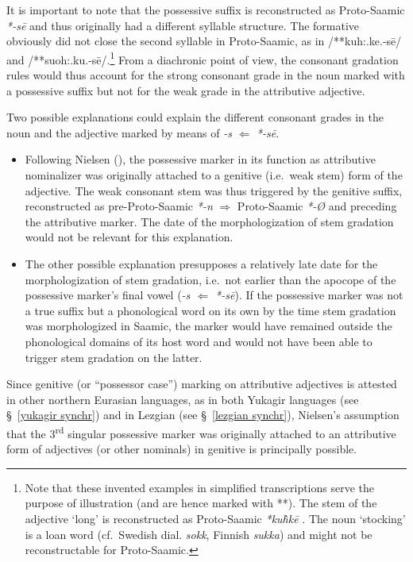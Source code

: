 {It is important to note that the possessive suffix is reconstructed as Proto-Saamic \textit{*-sē} \cite[73]{sammallahti1998b} and thus originally had a different syllable structure. The formative obviously did not close the second syllable in Proto-Saamic, as in /**kuh:.ke.-sē/ and /**suoh:.ku.-sē/.\footnote{Note that these invented examples in simplified transcriptions serve the purpose of illustration (and are hence marked with **). The stem of the adjective ‘long’ is reconstructed as Proto-Saamic \textit{*ku\`{h}kē} \cite[246]{sammallahti1998b}. The noun ‘stocking’ is a loan word (cf.~Swedish dial. \textit{sokk}, Finnish \textit{sukka}) and might not be reconstructable for Proto-Saamic.} From a diachronic point of view, the consonant gradation rules would thus account for the strong consonant grade in the noun marked with a possessive suffix but not for the weak grade in the attributive adjective.
 
Two possible explanations could explain the different consonant grades in the noun and the adjective marked by means of \textit{-s} $\Leftarrow$ \textit{*-sē}.
\begin{itemize}
\item Following Nielsen (\citeyear{nielsen1945b}), the possessive marker in its function as attributive nominalizer was originally attached to a genitive (i.e.~weak stem) form of the adjective. The weak consonant stem was thus triggered by the genitive suffix, reconstructed as pre-Proto-Saamic \textit{*-n} $\Rightarrow$ Proto-Saamic \mbox{\textit{*-Ø}} \cite[65]{sammallahti1998b} and preceding the attributive marker. The date of the morphologization of stem gradation would not be relevant for this explanation.
\item The other possible explanation presupposes a relatively late date for the morphologization of stem gradation, i.e.~not earlier than the apocope of the possessive marker's final vowel (\textit{-s $\Leftarrow$ *-sē}). If the possessive marker was not a true suffix but a phonological word on its own by the time stem gradation was morphologized in Saamic, the marker would have remained outside the phonological domains of its host word and would not have been able to trigger stem gradation on the latter. 
\end{itemize}
Since genitive (or “possessor case”) marking on attributive adjectives is attested in other northern Eurasian languages, as in both Yukagir languages (see \S~\ref{yukagir synchr}) and in Lezgian (see \S~\ref{lezgian synchr}), Nielsen's assumption that the 3\textsuperscript{rd} singular possessive marker was originally attached to an attributive form of adjectives (or other nominals) in genitive is principally possible. 

}
